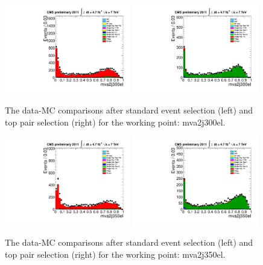 \begin{figure}[!t]
  \centering
  \includegraphics[width=0.49\textwidth]{figs/cl-mva2j300el-normal.pdf}
  \includegraphics[width=0.49\textwidth]{figs/cl-mva2j300el-inTTbar.pdf}
  \caption{\label{fig:mva:plots-mva2j300el} The data-MC comparisons
    after standard event selection (left) and top pair
    selection (right) for the working point: mva2j300el.}
\end{figure}

\begin{figure}[!t]
  \centering
  \includegraphics[width=0.49\textwidth]{figs/cl-mva2j350el-normal.pdf}
  \includegraphics[width=0.49\textwidth]{figs/cl-mva2j350el-inTTbar.pdf}
  \caption{\label{fig:mva:plots-mva2j350el} The data-MC comparisons
    after standard event selection (left) and top pair
    selection (right) for the working point: mva2j350el.}
\end{figure}

